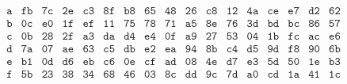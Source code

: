 \begin{Revision}
\begin{ejs}
\begin{table}[H]
\[\begin{array}{c|*{16}{c}}
\texttt{a} & \texttt{fb} & \texttt{7c} & \texttt{2e} & \texttt{c3} & \texttt{8f} & \texttt{b8} & \texttt{65} & \texttt{48} & \texttt{26} & \texttt{c8} & \texttt{12} & \texttt{4a} & \texttt{ce} & \texttt{e7} & \texttt{d2} & \texttt{62} \\
\texttt{b} & \texttt{0c} & \texttt{e0} & \texttt{1f} & \texttt{ef} & \texttt{11} & \texttt{75} & \texttt{78} & \texttt{71} & \texttt{a5} & \texttt{8e} & \texttt{76} & \texttt{3d} & \texttt{bd} & \texttt{bc} & \texttt{86} & \texttt{57} \\
\texttt{c} & \texttt{0b} & \texttt{28} & \texttt{2f} & \texttt{a3} & \texttt{da} & \texttt{d4} & \texttt{e4} & \texttt{0f} & \texttt{a9} & \texttt{27} & \texttt{53} & \texttt{04} & \texttt{1b} & \texttt{fc} & \texttt{ac} & \texttt{e6} \\
\texttt{d} & \texttt{7a} & \texttt{07} & \texttt{ae} & \texttt{63} & \texttt{c5} & \texttt{db} & \texttt{e2} & \texttt{ea} & \texttt{94} & \texttt{8b} & \texttt{c4} & \texttt{d5} & \texttt{9d} & \texttt{f8} & \texttt{90} & \texttt{6b} \\
\texttt{e} & \texttt{b1} & \texttt{0d} & \texttt{d6} & \texttt{eb} & \texttt{c6} & \texttt{0e} & \texttt{cf} & \texttt{ad} & \texttt{08} & \texttt{4e} & \texttt{d7} & \texttt{e3} & \texttt{5d} & \texttt{50} & \texttt{1e} & \texttt{b3} \\
\texttt{f} & \texttt{5b} & \texttt{23} & \texttt{38} & \texttt{34} & \texttt{68} & \texttt{46} & \texttt{03} & \texttt{8c} & \texttt{dd} & \texttt{9c} & \texttt{7d} & \texttt{a0} & \texttt{cd} & \texttt{1a} & \texttt{41} & \texttt{1c} \\
\end{array}
\]
\vspace{-1.2em}
\caption{Inversos en $\Z_2[x]/(x^8 + x^4 + x^3 + x + 1)$ expresados en hexadecimal.}
\label{tab:invGF256}
\end{table}
\vspace{-0.3em}


\end{ejs}
\end{Revision}


    
